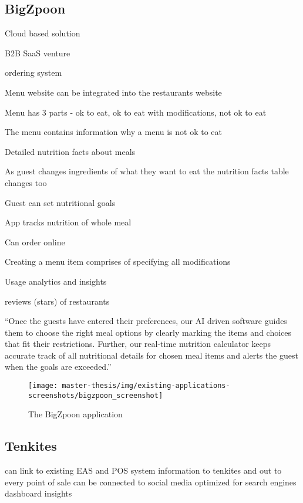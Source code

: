\subsection*{BigZpoon}
  Cloud based solution

  B2B SaaS venture

  ordering system

  Menu website can be integrated into the restaurants website

  Menu has 3 parts - ok to eat, ok to eat with modifications, not ok to eat

  The menu contains information why a menu is not ok to eat

  Detailed nutrition facts about meals

  As guest changes ingredients of what they want to eat the nutrition facts table changes too

  Guest can set nutritional goals

  App tracks nutrition of whole meal

  Can order online

  Creating a menu item comprises of specifying all modifications

  Usage analytics and insights 

  reviews (stars) of restaurants

  “Once the guests have entered their preferences, our AI driven software guides them to choose the right meal options by clearly marking the items and choices that fit their restrictions.  Further, our real-time nutrition calculator keeps accurate track of all nutritional details for chosen meal items and alerts the guest when the goals are exceeded.”

  \begin{figure}[h]
    \centering
    \texttt{[image: master-thesis/img/existing-applications-screenshots/bigzpoon\_screenshot]}
    \caption{The BigZpoon application}
  \end{figure}

\subsection*{Tenkites}
  can link to existing EAS and POS system
  information to tenkites and out to every point of sale
  can be connected to social media
  optimized for search engines
  dashboard insights

